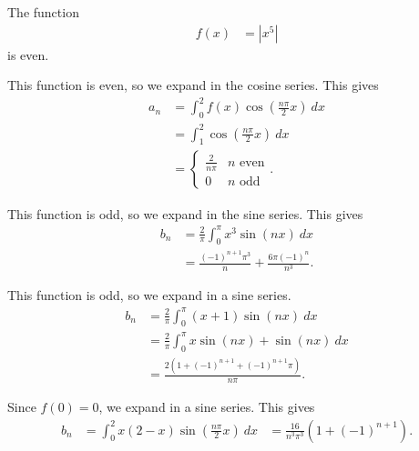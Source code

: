 \documentclass[10pt]{mypackage}
\begin{document}
\begin{solution}[11.3, Problem 10]
  The function
  \begin{align*}
    f(x) &= \left\vert x^{5} \right\vert
  \end{align*}
  is even.
\end{solution}
\begin{solution}[11.3, Problem 12]
  This function is even, so we expand in the cosine series. This gives
  \begin{align*}
    a_n &= \int_{0}^{2} f(x)\cos\left( \frac{n\pi }{2} x\right)\:dx\\
        &= \int_{1}^{2} \cos\left( \frac{n\pi }{2}x \right)\:dx\\
        &= \begin{cases}
          \frac{2}{n\pi} & n\text{ even}\\
          0 & n\text{ odd}
        \end{cases}.
  \end{align*}
\end{solution}
\begin{solution}[11.3, Problem 18]
  This function is odd, so we expand in the sine series. This gives
  \begin{align*}
    b_n &= \frac{2}{\pi}\int_{0}^{\pi} x^3\sin\left( nx \right)\:dx\\
        &= \frac{\left( -1 \right)^{n+1}\pi^3}{n} + \frac{6\pi\left( -1 \right)^{n}}{n^3}.
  \end{align*}
\end{solution}
\begin{solution}[11.3, Problem 20]
  This function is odd, so we expand in a sine series.
  \begin{align*}
    b_n &= \frac{2}{\pi} \int_{0}^{\pi} \left( x + 1 \right)\sin\left( nx \right)\:dx\\
        &= \frac{2}{\pi} \int_{0}^{\pi} x\sin\left( nx \right) + \sin\left( nx \right)\:dx\\
        &= \frac{2\left( 1 + \left( -1 \right)^{n+1} + \left( -1 \right)^{n+1}\pi \right)}{n\pi}.
  \end{align*}
\end{solution}
\begin{solution}[11.3, Problem 34]
  Since $f(0) = 0$, we expand in a sine series. This gives
  \begin{align*}
    b_n &= \int_{0}^{2} x\left( 2-x \right)\sin\left( \frac{n\pi}{2}x \right)\:dx
        &= \frac{16}{n^3\pi^3}\left( 1 + \left( -1 \right)^{n+1} \right).
  \end{align*}
\end{solution}
\end{document}
